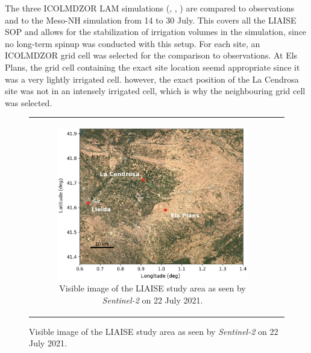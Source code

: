 \hfill

The three ICOLMDZOR LAM simulations (\noirr, \irr, \irrboost) are compared to observations and to the Meso-NH simulation from 14 to 30 July. This covers all the LIAISE SOP and allows for the stabilization of irrigation volumes in the \irrboost simulation, since no long-term spinup was conducted with this setup.
For each site, an ICOLMDZOR grid cell was selected for the comparison to observations. At Els Plans, the grid cell containing the exact site location seemd appropriate since it was a very lightly irrigated cell. however, the exact position of the La Cendrosa site was not in an intensely irrigated cell, which is why the neighbouring grid cell was selected.

\begin{figure}[hbtp]
    \centering
    \begin{tabular}{cc}
        \begin{subfigure}[t]{0.44\textwidth}
            \caption{Visible image of the LIAISE study area as seen by \textit{Sentinel-2} on 22 July 2021.}
            \includegraphics[width=\textwidth]{images/chap5/liaise_overview_lunel.png}
        \end{subfigure} &


\end{tabular}
\end{figure}
